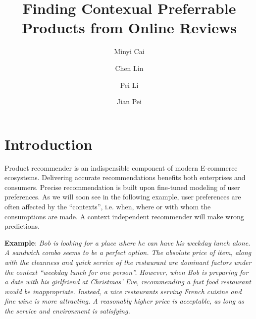 \documentclass[preprint,12pt]{elsarticle}
\begin{document}
\begin{frontmatter}

\title{Finding Contexual Preferrable Products from Online Reviews}
\author{Minyi Cai}
\author{Chen Lin}
\author{Pei Li}
\address{School of Information Science and Engineering, Xiamen University, Xiamen, 361005, China}
\author{Jian Pei}
\address{School of Computing Science, Simon Fraser University, Burnaby, V5A1S6, Canada}


\maketitle
\begin{abstract}

\end{abstract}

\begin{keyword}
\end{keyword}

\end{frontmatter}

\section{Introduction}\label{sec:intro}
Product recommender is an indispensible component of modern E-commerce ecosystems. Delivering accurate recommendations benefits both enterprises and consumers. Precise recommendation is built upon fine-tuned modeling of user preferences. As we will soon see in the following example, user preferences are often affected by the ``contexts'', i.e. when, where or with whom the consumptions are made. A context independent recommender will make wrong predictions.

\textbf{Example}: \textit{Bob is looking for a place where he can have his weekday lunch alone. A sandwich combo seems to be a perfect option. The absolute price of item, along with the cleanness and quick service of the restaurant are dominant factors under the context ``weekday lunch for one person''. However, when Bob is preparing for a date with his girlfriend at Christmas' Eve, recommending a fast food restaurant would be inappropriate. Instead, a nice restaurants serving French cuisine and fine wine is more attracting. A reasonably higher price is acceptable, as long as the service and environment is satisfying.}
\end{document}
